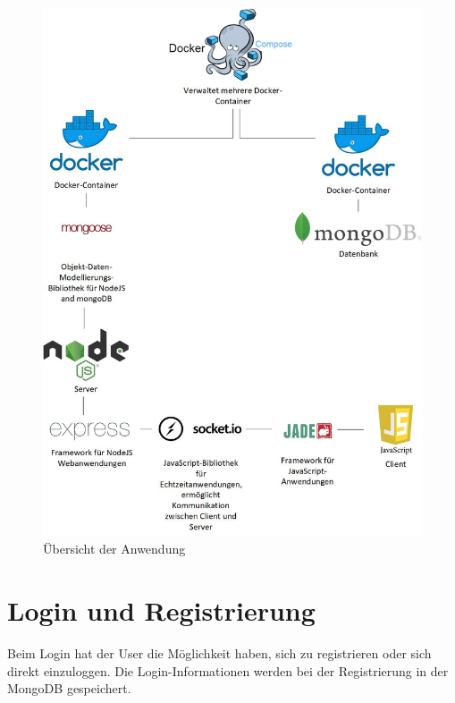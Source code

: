 \begin{figure}[H]
\centering
\includegraphics[width=1\textwidth]{images/uebersicht.jpg}
\caption{Übersicht der Anwendung}
\label{fig:koncept}
\end{figure}


\section{Login und Registrierung}\label{sec:Login}
Beim Login hat der User die Möglichkeit haben, sich zu registrieren oder sich direkt einzuloggen. Die Login-Informationen werden bei der Registrierung in der MongoDB gespeichert. 

